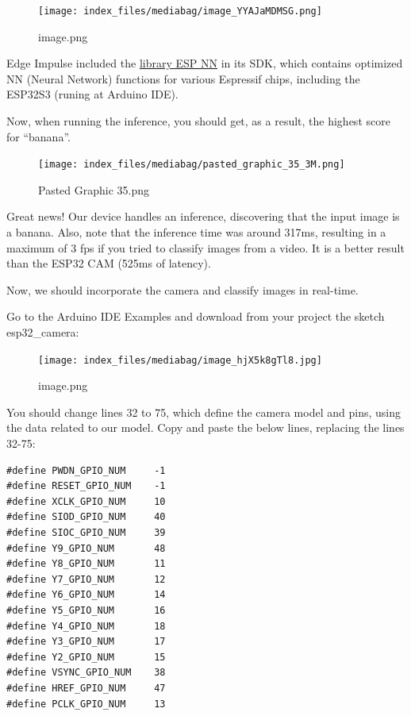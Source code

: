 \documentclass[
  letterpaper,
  DIV=11,
  numbers=noendperiod]{scrreprt}
\begin{document}
\begin{figure}[H]

{\centering \texttt{[image: index\_files/mediabag/image\_YYAJaMDMSG.png]}

}

\caption{image.png}

\end{figure}

Edge Impulse included the
\href{https://github.com/espressif/esp-nn}{library ESP NN} in its SDK,
which contains optimized NN (Neural Network) functions for various
Espressif chips, including the ESP32S3 (runing at Arduino IDE).

Now, when running the inference, you should get, as a result, the
highest score for ``banana''.

\begin{figure}[H]

{\centering \texttt{[image: index\_files/mediabag/pasted\_graphic\_35\_3M.png]}

}

\caption{Pasted Graphic 35.png}

\end{figure}

Great news! Our device handles an inference, discovering that the input
image is a banana. Also, note that the inference time was around 317ms,
resulting in a maximum of 3 fps if you tried to classify images from a
video. It is a better result than the ESP32 CAM (525ms of latency).

Now, we should incorporate the camera and classify images in real-time.

Go to the Arduino IDE Examples and download from your project the sketch
esp32\_camera:

\begin{figure}[H]

{\centering \texttt{[image: index\_files/mediabag/image\_hjX5k8gTl8.jpg]}

}

\caption{image.png}

\end{figure}

You should change lines 32 to 75, which define the camera model and
pins, using the data related to our model. Copy and paste the below
lines, replacing the lines 32-75:

\begin{verbatim}
#define PWDN_GPIO_NUM     -1 
#define RESET_GPIO_NUM    -1 
#define XCLK_GPIO_NUM     10 
#define SIOD_GPIO_NUM     40 
#define SIOC_GPIO_NUM     39
#define Y9_GPIO_NUM       48 
#define Y8_GPIO_NUM       11 
#define Y7_GPIO_NUM       12 
#define Y6_GPIO_NUM       14 
#define Y5_GPIO_NUM       16 
#define Y4_GPIO_NUM       18 
#define Y3_GPIO_NUM       17 
#define Y2_GPIO_NUM       15 
#define VSYNC_GPIO_NUM    38 
#define HREF_GPIO_NUM     47 
#define PCLK_GPIO_NUM     13
\end{verbatim}
\end{document}
